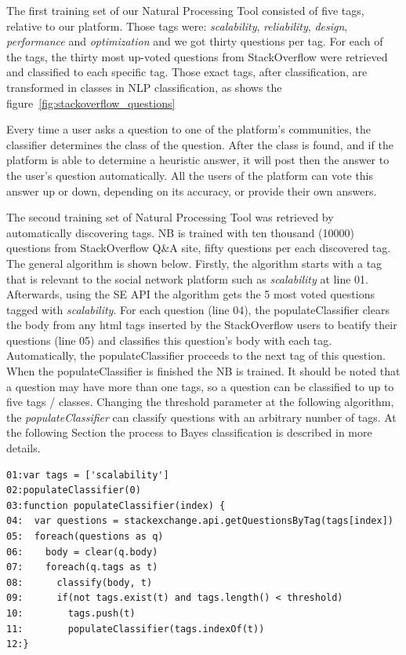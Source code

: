 The first training set of our Natural Processing Tool consisted of five tags, relative to our platform. Those tags were: \emph{scalability}, \emph{reliability}, \emph{design}, \emph{performance} and \emph{optimization} and we got thirty questions per tag. For each of the tags, the thirty most up-voted questions from StackOverflow were retrieved and classified to each specific tag. Those exact tags, after classification, are transformed in classes in NLP classification, as shows the figure~\ref{fig:stackoverflow_questions}

Every time a user asks a question to one of the platform's communities, the classifier determines the class of the question. After the class is found, and if the platform is able to determine a heuristic answer, it will post then the answer to the user's question automatically. All the users of the platform can vote this answer up or down, depending on its accuracy, or provide their own answers.

The second training set of Natural Processing Tool was retrieved by automatically discovering tags. NB is trained with ten thousand (10000) questions from StackOverflow Q\&A site, fifty questions per each discovered tag. The general algorithm is shown below. Firstly, the algorithm starts with a tag that is relevant to the social network platform such as \emph{scalability} at line 01. Afterwards, using the SE API the algorithm gets the 5 most voted questions tagged with \emph{scalability}. For each question (line 04), the populateClassifier clears the body from any html tags inserted by the StackOverflow users to beatify their questions (line 05) and classifies this question's body with each tag. Automatically, the populateClassifier proceeds to the next tag of this question. When the populateClassifier is finished the NB is trained. It should be noted that a question may have more than one tags, so a question can be classified to up to five tags / classes. Changing the threshold parameter at the following algorithm, the \emph{populateClassifier} can classify questions with an arbitrary number of tags. At the following Section the process to Bayes classification is described in more details.

\begin{lstlisting} 
01:var tags = ['scalability']
02:populateClassifier(0)
03:function populateClassifier(index) {
04:  var questions = stackexchange.api.getQuestionsByTag(tags[index])
05:  foreach(questions as q)
06:    body = clear(q.body)
07:    foreach(q.tags as t)
08:    	 classify(body, t)
09:    	 if(not tags.exist(t) and tags.length() < threshold)
10:    	   tags.push(t)	  
11:        populateClassifier(tags.indexOf(t))
12:}		
\end{lstlisting}

